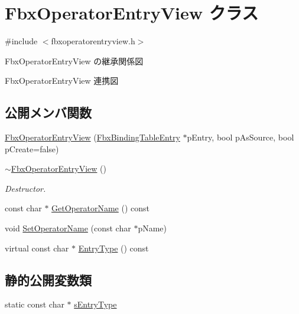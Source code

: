 \hypertarget{class_fbx_operator_entry_view}{}\section{Fbx\+Operator\+Entry\+View クラス}
\label{class_fbx_operator_entry_view}


{\ttfamily \#include $<$fbxoperatorentryview.\+h$>$}



Fbx\+Operator\+Entry\+View の継承関係図


Fbx\+Operator\+Entry\+View 連携図
\subsection*{公開メンバ関数}
\begin{DoxyCompactItemize}
\item 
\hyperlink{class_fbx_operator_entry_view_aa76912191b34b80d88112072b6915182}{Fbx\+Operator\+Entry\+View} (\hyperlink{class_fbx_binding_table_entry}{Fbx\+Binding\+Table\+Entry} $\ast$p\+Entry, bool p\+As\+Source, bool p\+Create=false)
\item 
\hyperlink{class_fbx_operator_entry_view_a3f2e342d536396b35ec1308719295777}{$\sim$\+Fbx\+Operator\+Entry\+View} ()
\begin{DoxyCompactList}\small\item\em Destructor. \end{DoxyCompactList}\item 
const char $\ast$ \hyperlink{class_fbx_operator_entry_view_a7ce91f3c0d933aa9bb0ad8b9c1f82c32}{Get\+Operator\+Name} () const
\item 
void \hyperlink{class_fbx_operator_entry_view_a00d1bca18f1450d07326d22e889c7520}{Set\+Operator\+Name} (const char $\ast$p\+Name)
\item 
virtual const char $\ast$ \hyperlink{class_fbx_operator_entry_view_a7821c1bf43a30e4c8ba054c66f051ad0}{Entry\+Type} () const
\end{DoxyCompactItemize}
\subsection*{静的公開変数類}
\begin{DoxyCompactItemize}
\item 
static const char $\ast$ \hyperlink{class_fbx_operator_entry_view_aff3745ef35e5025550d54e7c2343ea95}{s\+Entry\+Type}
\end{DoxyCompactItemize}
